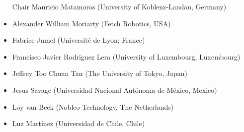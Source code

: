 \begin{itemize}
  \item[Chair] Mauricio Matamoros (University of Koblenz-Landau, Germany)
  \item Alexander William Moriarty (Fetch Robotics, USA)
  \item Fabrice Jumel (Université de Lyon; France)
  \item Francisco Javier Rodriguez Lera (University of Luxembourg, Luxembourg)
  \item Jeffrey Too Chuan Tan (The University of Tokyo, Japan)
  \item Jesus Savage (Universidad Nacional Autónoma de México, Mexico)
  \item Loy van Beek (Nobleo Technology, The Netherlands)
  \item Luz Martínez (Universidad de Chile, Chile)
\end{itemize}
